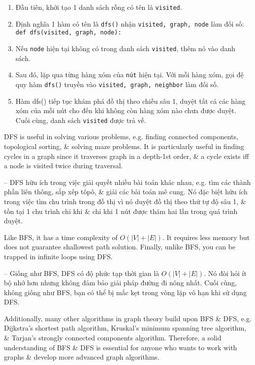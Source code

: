 \documentclass{article}
\begin{document}
\begin{itemize}
\begin{itemize}
\begin{itemize}
\begin{enumerate}
                \item Đầu tiên, khởi tạo 1 danh sách rỗng có tên là {\tt visited}.
                \item Định nghĩa 1 hàm có tên là {\tt dfs()} nhận {\tt visited, graph, node} làm đối số: {\tt def dfs(visited, graph, node):}
                \item Nếu {\tt node} hiện tại không có trong danh sách {\tt visited}, thêm nó vào danh sách.
                \item Sau đó, lặp qua từng hàng xóm của {\tt nút} hiện tại. Với mỗi hàng xóm, gọi đệ quy hàm {\tt dfs()} truyền vào {\tt visited, graph, neighbor} làm đối số.
                \item Hàm {\sf dfs()} tiếp tục khám phá đồ thị theo chiều sâu 1, duyệt tất cả các hàng xóm của mỗi nút cho đến khi không còn hàng xóm nào chưa được duyệt. Cuối cùng, danh sách {\tt visited} được trả về.
            \end{enumerate}
            DFS is useful in solving various problems, e.g. finding connected components, topological sorting, \& solving maze problems. It is particularly useful in finding cycles in a graph since it traverses graph in a depth-1st order, \& a cycle exists iff a node is visited twice during traversal.

            -- DFS hữu ích trong việc giải quyết nhiều bài toán khác nhau, e.g. tìm các thành phần liên thông, sắp xếp tôpô, \& giải các bài toán mê cung. Nó đặc biệt hữu ích trong việc tìm chu trình trong đồ thị vì nó duyệt đồ thị theo thứ tự độ sâu 1, \& tồn tại 1 chu trình chỉ khi \& chỉ khi 1 nút được thăm hai lần trong quá trình duyệt.

            Like BFS, it has a time complexity of $O(|V| + |E|)$. It requires less memory but does not guarantee shallowest path solution. Finally, unlike BFS, you can be trapped in infinite loops using DFS.

            -- Giống như BFS, DFS có độ phức tạp thời gian là $O(|V| + |E|)$. Nó đòi hỏi ít bộ nhớ hơn nhưng không đảm bảo giải pháp đường đi nông nhất. Cuối cùng, không giống như BFS, bạn có thể bị mắc kẹt trong vòng lặp vô hạn khi sử dụng DFS.

            Additionally, many other algorithms in graph theory build upon BFS \& DFS, e.g. Dijkstra's shortest path algorithm, Kruskal's minimum spanning tree algorithm, \& Tarjan's strongly connected components algorithm. Therefore, a solid understanding of BFS \& DFS is essential for anyone who wants to work with graphs \& develop more advanced graph algorithms.


\end{itemize}
\end{itemize}
\end{itemize}
\end{document}
